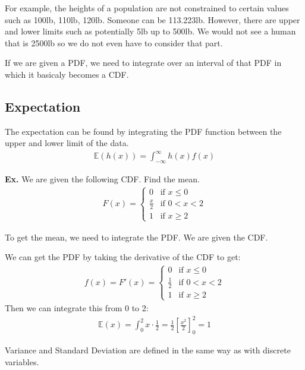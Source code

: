 \documentclass[12pt,letterpaper]{article} \usepackage{amsmath} \usepackage{graphicx} \usepackage[margin=1in]{geometry} \usepackage{longtable}  \usepackage{amssymb}
\begin{document}
	For example, the heights of a population are not constrained to certain values such as 100lb, 110lb, 120lb. Someone can be 113.223lb. However, there are upper and lower limits such as potentially 5lb up to 500lb. We would not see a human that is 2500lb so we do not even have to consider that part.
	
	If we are given a PDF, we need to integrate over an interval of that PDF in which it basicaly becomes a CDF. 
	
	\subsection{Expectation}
	The expectation can be found by integrating the PDF function between the upper and lower limit of the data. 
	\begin{align*}
		\mathbb E(h(x)) = \int_{-\infty}^{\infty}h(x)f(x)
	\end{align*}

	\begin{mdframed}
		\textbf{Ex. }We are given the following CDF. Find the mean.
		\begin{align*}
			F(x) = \begin{cases}
				0 & \text{if } x \leq 0 \\
				\frac{x}{2} & \text{if } 0 < x < 2 \\
				1 & \text{if } x \geq 2
			\end{cases}
		\end{align*}
	
		To get the mean, we need to integrate the PDF. We are given the CDF. 
		
		We can get the PDF by taking the derivative of the CDF to get:
		\begin{align*}
			f(x) = F\prime (x) = \begin{cases}
				0 & \text{if } x \leq 0 \\
				\frac{1}{2} & \text{if } 0 < x < 2 \\
				1 & \text{if } x \geq 2
			\end{cases}
		\end{align*}
		Then we can integrate this from 0 to 2:
		\begin{align*}
			\mathbb E(x) = \int_0^2 x \cdot \frac{1}{2} = \frac{1}{2}\left[\frac{x^2}{2}\right]^2_0 = 1
		\end{align*}
	\end{mdframed}

	Variance and Standard Deviation are defined in the same way as with discrete variables. 
	
\end{document}
